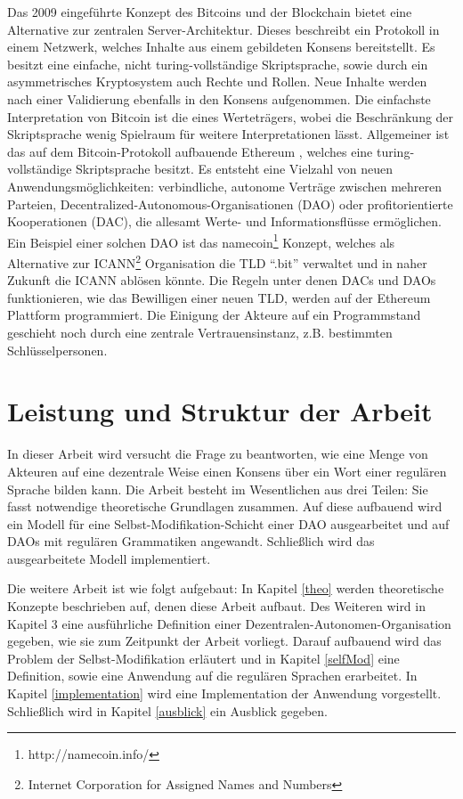 \documentclass[a4paper,12pt]{report}
\begin{document}
Das 2009 eingeführte Konzept des Bitcoins und der Blockchain\cite{Nakamoto2008} bietet eine Alternative zur zentralen Server-Architektur. Dieses beschreibt ein Protokoll in einem Netzwerk, welches Inhalte aus einem gebildeten Konsens bereitstellt. Es besitzt eine einfache, nicht turing-vollständige Skriptsprache, sowie durch ein asymmetrisches Kryptosystem auch Rechte und Rollen. Neue Inhalte werden nach einer Validierung ebenfalls in den Konsens aufgenommen. Die einfachste Interpretation von Bitcoin ist die eines Werteträgers, wobei die Beschränkung der Skriptsprache wenig Spielraum für weitere Interpretationen lässt.
Allgemeiner ist das auf dem Bitcoin-Protokoll aufbauende Ethereum\cite{Wood2014} , welches eine turing-vollständige Skriptsprache besitzt.
Es entsteht eine Vielzahl von neuen Anwendungsmöglichkeiten: verbindliche, autonome Verträge zwischen mehreren Parteien, Decentralized-Autonomous-Organisationen (DAO) oder profitorientierte Kooperationen (DAC), die allesamt Werte- und Informationsflüsse ermöglichen.
Ein Beispiel einer solchen DAO ist das namecoin\footnote{http://namecoin.info/} Konzept, welches als Alternative zur ICANN\footnote{Internet Corporation for Assigned Names and Numbers} Organisation die TLD ``.bit'' verwaltet und in naher Zukunft die ICANN ablösen könnte.\cite{Corporation2014} Die Regeln unter denen DACs und DAOs funktionieren, wie das Bewilligen einer neuen TLD, werden auf der Ethereum Plattform programmiert.
Die Einigung der Akteure auf ein Programmstand geschieht noch durch eine zentrale Vertrauensinstanz, z.B. bestimmten Schlüsselpersonen.


\section*{Leistung und Struktur der Arbeit}
In dieser Arbeit wird versucht die Frage zu beantworten, wie eine Menge von Akteuren auf eine dezentrale Weise einen Konsens über ein Wort einer regulären Sprache bilden kann.
Die Arbeit besteht im Wesentlichen aus drei Teilen: Sie fasst notwendige theoretische Grundlagen zusammen. Auf diese aufbauend wird ein Modell für eine Selbst-Modifikation-Schicht einer DAO ausgearbeitet und auf DAOs mit regulären Grammatiken angewandt. Schließlich wird das ausgearbeitete Modell implementiert.

Die weitere Arbeit ist wie folgt aufgebaut: In Kapitel \ref{theo} werden theoretische Konzepte beschrieben auf, denen diese Arbeit aufbaut. Des Weiteren wird in Kapitel 3 eine ausführliche Definition einer Dezentralen-Autonomen-Organisation gegeben, wie sie zum Zeitpunkt der Arbeit vorliegt. Darauf aufbauend wird das Problem der Selbst-Modifikation erläutert und in Kapitel \ref{selfMod} eine Definition, sowie eine Anwendung auf die regulären Sprachen erarbeitet. In Kapitel \ref{implementation} wird eine Implementation der Anwendung vorgestellt. Schließlich wird in Kapitel \ref{ausblick} ein Ausblick gegeben.
\end{document}
